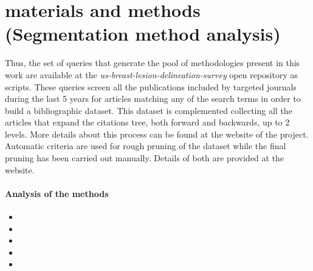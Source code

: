 \graphicspath{ {./content/analysis/figures} }

\section{materials and methods (Segmentation method analysis)}

Thus, the set of queries that generate the pool of methodologies present in this work are available at the \emph{us-breast-lesion-delineation-survey} open repository as scripts.
These queries screen all the publications included by targeted journals during the last 5 years for articles matching any of the search terms in order to build a bibliographic dataset. This dataset is complemented collecting all the articles that expand the citations tree, both forward and backwards, up to 2 levels. More details about this process can be found at the website of the project. Automatic criteria are used for rough pruning of the dataset while the final pruning has been carried out manually. Details of both are provided at the website.

\paragraph{Analysis of the methods}
\label{sec:intro:analysis_of_the_methods}
\begin{itemize}
  \item {}
  \item {}
  \item {}
  \item {}
  \item {}
\end{itemize}


